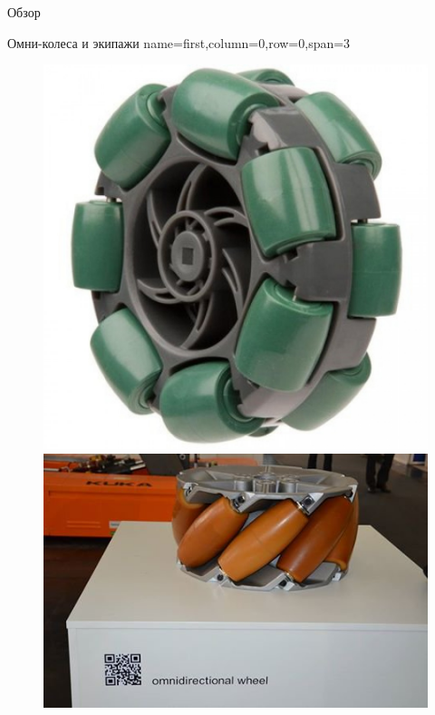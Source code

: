 \begin{myposter}{
    Обзор
}

    \headerbox
    {Омни-колеса и экипажи}
    {name=first,column=0,row=0,span=3}
    {
        \vspace{-5pt}
        \begin{figure}[H]
            \centering
                \centering
                \includegraphics[width=\linewidth]{content/pic/photo/wheel_two_rows.jpg}
            \endminipage
                \centering
                \includegraphics[width=\linewidth]{content/pic/photo/wheel_mecanum.jpg}

\end{figure}}
\end{myposter}
